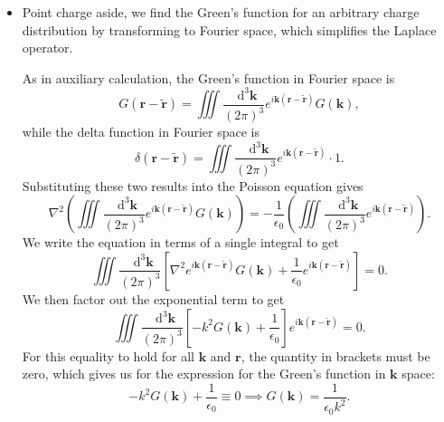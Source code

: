 \documentclass[11pt, a4paper]{article}
\newcommand{\diff}{\mathop{}\!\mathrm{d}} %
\newcommand{\dk}{\diff^{3} \vec{k}}  %
\renewcommand{\vec}[1]{\bm{#1}} %
\renewcommand{\t}[1]{\tilde{#1}} %
\renewcommand{\r}{\vec{r}}
\renewcommand{\k}{\vec{k}}
\newcommand{\ee}{\epsilon_{0}}  %
\renewcommand{\laplacian}{\nabla^{2}}
\begin{document}
\begin{itemize}
	\item Point charge aside, we find the Green's function for an arbitrary charge distribution by transforming to Fourier space, which simplifies the Laplace operator. 
	
	As in auxiliary calculation, the Green's function in Fourier space is
	\begin{equation*}
		G(\r - \t{\r}) = \iiint \frac{\dk}{(2\pi)^{3}}e^{i\k(\r - \t{\r})}G(\k),
	\end{equation*}
	while the delta function in Fourier space is
	\begin{equation*}
		\delta(\r - \t{\r}) = \iiint \frac{\dk}{(2\pi)^{3}}e^{i\k(\r - \t{\r})}\cdot 1.
	\end{equation*}
	Substituting these two results into the Poisson equation gives
	\begin{equation*}
		\laplacian \left(\iiint \frac{\dk}{(2\pi)^{3}} e^{i\k(\r - \t{\r})} G(\k)\right) = -\frac{1}{\ee} \left(\iiint \frac{\dk}{(2\pi)^{3}}e^{i\k(\r - \t{\r})} \right).
	\end{equation*}
	We write the equation in terms of a single integral to get
	\begin{equation*}
		\iiint \frac{\dk}{(2\pi)^{3}} \left[\laplacian e^{i\k(\r - \t{\r})}G(\k) + \frac{1}{\ee}e^{i\k(\r - \t{\r})}\right] = 0.
	\end{equation*}
	We then factor out the exponential term to get
	\begin{equation*}
		\iiint \frac{\dk}{(2\pi)^{3}} \left[-k^{2} G(\k) + \frac{1}{\ee}\right]e^{i\k(\r - \t{\r})} = 0.
	\end{equation*}
	For this equality to hold for all $ \k $ and $ \r $, the quantity in brackets must be zero, which gives us for the expression for the Green's function in $ \k $ space:
	\begin{equation*}
		-k^{2} G(\k) + \frac{1}{\ee} \equiv 0 \implies G(\k) = \frac{1}{\ee k^{2}}.
	\end{equation*}
	

\end{itemize}
\end{document}
